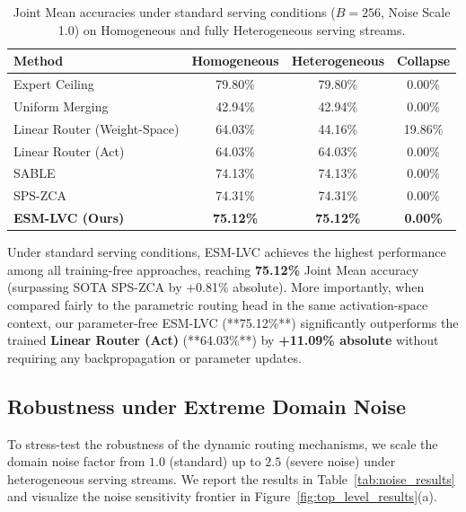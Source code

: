 \begin{table}[t]
\caption{Joint Mean accuracies under standard serving conditions ($B=256$, Noise Scale 1.0) on Homogeneous and fully Heterogeneous serving streams.}
\label{tab:main_results}
\vskip 0.15in
\begin{center}
\begin{small}
\begin{sc}
\begin{tabular}{lccc}
\toprule
Method & Homogeneous & Heterogeneous & Collapse \\
\midrule
Expert Ceiling & 79.80\% & 79.80\% & 0.00\% \\
Uniform Merging & 42.94\% & 42.94\% & 0.00\% \\
Linear Router (Weight-Space) & 64.03\% & 44.16\% & 19.86\% \\
Linear Router (Act) & 64.03\% & 64.03\% & 0.00\% \\
SABLE & 74.13\% & 74.13\% & 0.00\% \\
SPS-ZCA & 74.31\% & 74.31\% & 0.00\% \\
\textbf{ESM-LVC (Ours)} & \textbf{75.12\%} & \textbf{75.12\%} & \textbf{0.00\%} \\
\bottomrule
\end{tabular}
\end{sc}
\end{small}
\end{center}
\vskip -0.1in
\end{table}

Under standard serving conditions, ESM-LVC achieves the highest performance among all training-free approaches, reaching \textbf{75.12\%} Joint Mean accuracy (surpassing SOTA SPS-ZCA by +0.81\% absolute). More importantly, when compared fairly to the parametric routing head in the same activation-space context, our parameter-free ESM-LVC (**75.12\%**) significantly outperforms the trained \textbf{Linear Router (Act)} (**64.03\%**) by \textbf{+11.09\% absolute} without requiring any backpropagation or parameter updates.

\subsection{Robustness under Extreme Domain Noise}
To stress-test the robustness of the dynamic routing mechanisms, we scale the domain noise factor from $1.0$ (standard) up to $2.5$ (severe noise) under heterogeneous serving streams. We report the results in Table~\ref{tab:noise_results} and visualize the noise sensitivity frontier in Figure~\ref{fig:top_level_results}(a).

